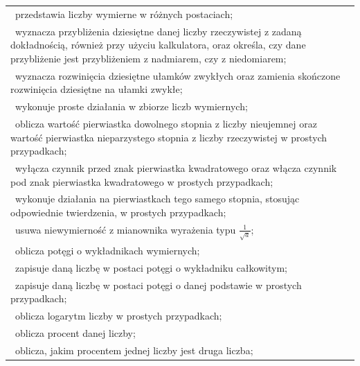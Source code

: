 \documentclass[12pt,a4paper]{article}
\begin{document}
\begin{longtable}{|p{16cm}|}
		\textbullet\ przedstawia liczby wymierne w różnych postaciach; \\
		
		\textbullet\ wyznacza przybliżenia dziesiętne danej liczby rzeczywistej z zadaną dokładnością, również przy użyciu kalkulatora, oraz określa, czy dane przybliżenie jest przybliżeniem z nadmiarem, czy z niedomiarem; \\
		
		\textbullet\ wyznacza rozwinięcia dziesiętne ułamków zwykłych oraz zamienia skończone rozwinięcia dziesiętne na ułamki zwykłe; \\
		
		\textbullet\ wykonuje proste działania w zbiorze liczb wymiernych; \\
		
		\textbullet\ oblicza wartość pierwiastka dowolnego stopnia z liczby nieujemnej oraz wartość pierwiastka nieparzystego stopnia z liczby rzeczywistej w prostych przypadkach; \\
		
		\textbullet\ wyłącza czynnik przed znak pierwiastka kwadratowego oraz włącza czynnik pod znak pierwiastka kwadratowego w prostych przypadkach; \\
		
		\textbullet\ wykonuje działania na pierwiastkach tego samego stopnia, stosując odpowiednie twierdzenia, w prostych przypadkach; \\
		
		\textbullet\ usuwa niewymierność z mianownika wyrażenia typu $\frac{1}{\sqrt{a}}$; \\
		
		\textbullet\ oblicza potęgi o wykładnikach wymiernych; \\
		
		\textbullet\ zapisuje daną liczbę w postaci potęgi o wykładniku całkowitym; \\
		
		\textbullet\ zapisuje daną liczbę w postaci potęgi o danej podstawie w prostych przypadkach; \\
		
		\textbullet\ oblicza logarytm liczby w prostych przypadkach; \\
		
		\textbullet\ oblicza procent danej liczby; \\
		
		\textbullet\ oblicza, jakim procentem jednej liczby jest druga liczba; \\
		

\end{longtable}
\end{document}
